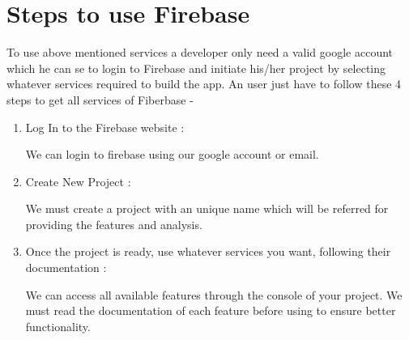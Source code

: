 \documentclass[12pt,a4paper]{report}
\begin{document}
\section{{\fontsize{16}{0}\selectfont Steps to use Firebase}}
{\fontsize{14}{0}\selectfont
\noindent
To use above mentioned services a developer only need a valid google account which he can se to login to Firebase and initiate his/her project by selecting whatever services required to build the app.
An user just have to follow these 4 steps to get all services of Fiberbase -
 
\vspace{.5cm}

\begin{enumerate}
  \item   Log In to the Firebase website :
  
  We can login to firebase using our google account or email.
  
  
  \item Create New Project : 
  
  We must create a project with an unique name which will be referred for providing the features and analysis.
  
  \item Once the project is ready, use whatever services you want, following their documentation :
  
  We can access all available features through the console of your project. We must read the documentation of each feature before using to ensure better functionality.  
\end{enumerate}
}
\newpage
\end{document}
